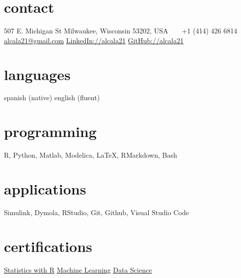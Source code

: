 \documentclass[]{../friggeri-cv} %
\begin{document}


\begin{aside} %
\section{contact}
507 E. Michigan St
Milwaukee, Wisconsin 53202, USA
~
\Mobilefone~ +1 (414) 426 6814
~
\href{mailto:alcala21@gmail.com}{alcala21@gmail.com}
\href{https://www.linkedin.com/in/alcala21}{LinkedIn://alcala21}
\href{https://www.github.com/alcala21}{GitHub://alcala21}
\section{languages}
spanish (native)
english (fluent)
\section{programming}
R, Python, Matlab,
Modelica, \LaTeX, 
RMarkdown, Bash
\section{applications}
Simulink, Dymola,
RStudio, Git, Github,
Visual Studio Code
\section{certifications}
\href{https://www.coursera.org/account/accomplishments/specialization/certificate/UWG3PS5EXMBJ}{Statistics with R}
\href{https://www.coursera.org/account/accomplishments/specialization/certificate/2VHFDHW5GUK6}{Machine Learning}
\href{https://www.coursera.org/account/accomplishments/specialization/certificate/W9DB45S3CGDZ}{Data Science}
\end{aside}

\end{document}
